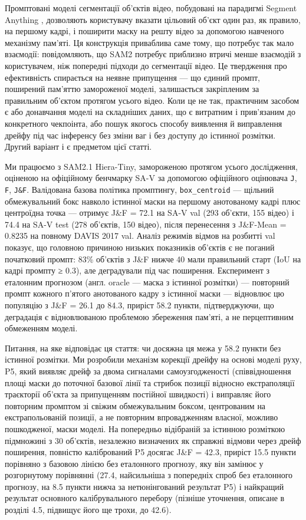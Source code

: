 \documentclass[11pt]{article}
\begin{document}
Промптовані моделі сегментації об'єктів відео, побудовані на парадигмі Segment Anything \citep{kirillov2023,ravi2024}, дозволяють користувачу вказати цільовий об'єкт один раз, як правило, на першому кадрі, і поширити маску на решту відео за допомогою навченого механізму пам'яті. Ця конструкція приваблива саме тому, що потребує так мало взаємодії: \citet{ravi2024} повідомляють, що SAM2 потребує приблизно втричі менше взаємодій з користувачем, ніж попередні підходи до сегментації відео. Це твердження про ефективність спирається на неявне припущення --- що єдиний промпт, поширений пам'яттю замороженої моделі, залишається закріпленим за правильним об'єктом протягом усього відео. Коли це не так, практичним засобом є або донавчання моделі на складніших даних, що є витратним і прив'язаним до конкретного чекпоінта, або пошук якогось способу виявлення й виправлення дрейфу під час інференсу без зміни ваг і без доступу до істинної розмітки. Другий варіант і є предметом цієї статті.

Ми працюємо з SAM2.1 Hiera-Tiny, замороженою протягом усього дослідження, оціненою на офіційному бенчмарку SA-V \citep{metaai2024} за допомогою офіційного оцінювача \texttt{J}, \texttt{F}, \texttt{J\&F}. Валідована базова політика промптингу, \texttt{box\_centroid} --- щільний обмежувальний бокс навколо істинної маски на першому анотованому кадрі плюс центроїдна точка --- отримує J\&F = 72.1 на SA-V val (293 об'єкти, 155 відео) і 74.4 на SA-V test (278 об'єктів, 150 відео), після перенесення з J\&F-Mean = 0.8235 на повному DAVIS 2017 val. Аналіз режимів відмов на розбитті val показує, що головною причиною низьких показників об'єктів є не поганий початковий промпт: 83\% об'єктів з J\&F нижче 40 мали правильний старт (IoU на кадрі промпту ≥ 0.3), але деградували під час поширення. Експеримент з еталонним прогнозом (англ. oracle --- маска з істинної розмітки) --- повторний промпт кожного п'ятого анотованого кадру з істинної маски --- відновлює цю популяцію з J\&F = 26.1 до 84.3, приріст 58.2 пункти, підтверджуючи, що деградація є відновлюваною проблемою збереження пам'яті, а не перцептивним обмеженням моделі.

Питання, на яке відповідає ця стаття: чи досяжна ця межа у 58.2 пункти без істинної розмітки. Ми розробили механізм корекції дрейфу на основі моделі руху, P5, який виявляє дрейф за двома сигналами самоузгодженості (співвідношення площі маски до поточної базової лінії та стрибок позиції відносно екстраполяції траєкторії об'єкта за припущенням постійної швидкості) і виправляє його повторним промптом зі свіжим обмежувальним боксом, центрованим на екстрапольованій позиції, а не повторним впровадженням власної, можливо пошкодженої, маски моделі. На попередньо відібраній за істинною розміткою підмножині з 30 об'єктів, незалежно визначених як справжні відмови через дрейф поширення, повністю калібрований P5 досягає J\&F = 42.3, приріст 15.5 пункти порівняно з базовою лінією без еталонного прогнозу, яку він замінює у розгорнутому порівнянні (27.4, найсильніша з попередніх спроб без еталонного прогнозу, на 8.5 пункти нижча за нетюнінгований результат P5) і найкращий результат основного калібрувального перебору (пізніше уточнення, описане в розділі 4.5, підвищує його ще трохи, до 42.6).
\end{document}
